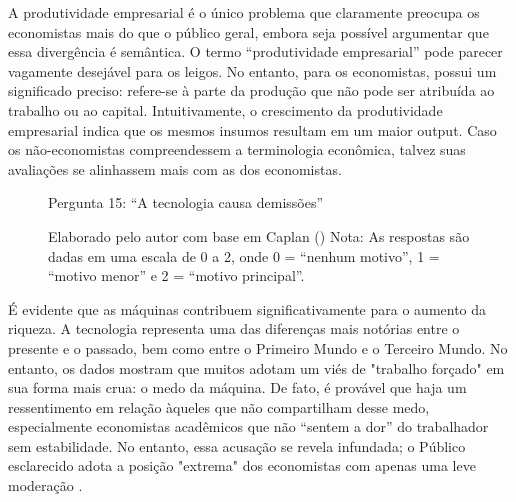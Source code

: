 A produtividade empresarial é o único problema que claramente preocupa os economistas mais do que o público geral, embora seja possível argumentar que essa divergência é semântica. O termo “produtividade empresarial” pode parecer vagamente desejável para os leigos. No entanto, para os economistas, possui um significado preciso: refere-se à parte da produção que não pode ser atribuída ao trabalho ou ao capital. Intuitivamente, o crescimento da produtividade empresarial indica que os mesmos insumos resultam em um maior output. Caso os não-economistas compreendessem a terminologia econômica, talvez suas avaliações se alinhassem mais com as dos economistas.

\begin{figure}[H]
    \centering
    \caption*{Pergunta 15: “A tecnologia causa demissões”}
    \caption{Elaborado pelo autor com base em Caplan (\citeyear{The_Myth_of_the_Rational_Voter}) \newline
    Nota: As respostas são dadas em uma escala de 0 a 2, onde 0 = “nenhum motivo”, 1 = “motivo menor” e 2 = “motivo principal”.}
    \label{fig:pergunta_15}
\end{figure}

É evidente que as máquinas contribuem significativamente para o aumento da riqueza. A tecnologia representa uma das diferenças mais notórias entre o presente e o passado, bem como entre o Primeiro Mundo e o Terceiro Mundo. No entanto, os dados mostram que muitos adotam um viés de "trabalho forçado" em sua forma mais crua: o medo da máquina. De fato, é provável que haja um ressentimento em relação àqueles que não compartilham desse medo, especialmente economistas acadêmicos que não “sentem a dor” do trabalhador sem estabilidade. No entanto, essa acusação se revela infundada; o Público esclarecido adota a posição "extrema" dos economistas com apenas uma leve moderação \cite{The_Myth_of_the_Rational_Voter}. 

